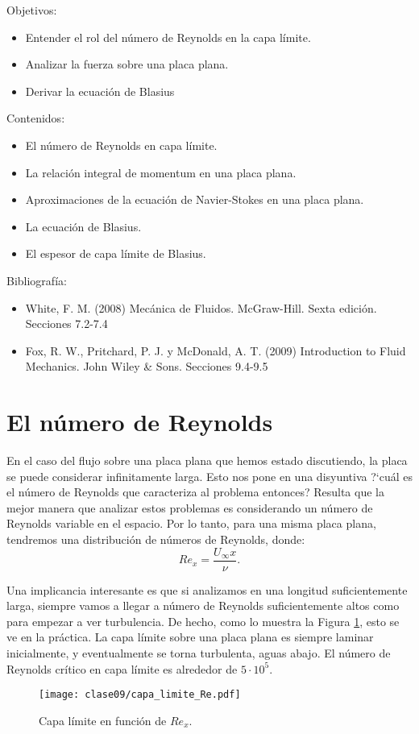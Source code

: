 \begin{framed}

Objetivos:
\begin{itemize}
    \item Entender el rol del número de Reynolds en la capa límite.
    \item Analizar la fuerza sobre una placa plana.
    \item Derivar la ecuación de Blasius
\end{itemize}

Contenidos:
\begin{itemize}
    \item El número de Reynolds en capa límite.
    \item La relación integral de momentum en una placa plana.
    \item Aproximaciones de la ecuación de Navier-Stokes en una placa plana.
    \item La ecuación de Blasius.
    \item El espesor de capa límite de Blasius.
\end{itemize}

Bibliografía:
\begin{itemize}
    \item White, F. M. (2008) Mecánica de Fluidos. McGraw-Hill. Sexta edición. Secciones 7.2-7.4
    \item Fox, R. W., Pritchard, P. J. y McDonald, A. T. (2009) Introduction to Fluid Mechanics. John Wiley \& Sons. Secciones 9.4-9.5
\end{itemize}
\end{framed}

\section*{El número de Reynolds}

En el caso del flujo sobre una placa plana que hemos estado discutiendo, la placa se puede considerar infinitamente larga.
Esto nos pone en una disyuntiva \mbox{?`}cuál es el número de Reynolds que caracteriza al problema entonces?
Resulta que la mejor manera que analizar estos problemas es considerando un número de Reynolds variable en el espacio.
Por lo tanto, para una misma placa plana, tendremos una distribución de números de Reynolds, donde:
%
\begin{equation}\label{eq:Re_capa}
Re_x = \frac{U_\infty x}{\nu}.
\end{equation}

Una implicancia interesante es que si analizamos en una longitud suficientemente larga, siempre vamos a llegar a número de Reynolds suficientemente altos como para empezar a ver turbulencia.
De hecho, como lo muestra la Figura \ref{fig:capa_limite_Re}, esto se ve en la práctica. 
La capa límite sobre una placa plana es siempre laminar inicialmente, y eventualmente se torna turbulenta, aguas abajo.
El número de Reynolds crítico en capa límite es alrededor de $5\cdot10^{5}$.
%
\begin{figure}[!h]
\centering
\texttt{[image: clase09/capa\_limite\_Re.pdf]}
\caption{Capa límite en función de $Re_x$.}
\label{fig:capa_limite_Re}
\end{figure}

